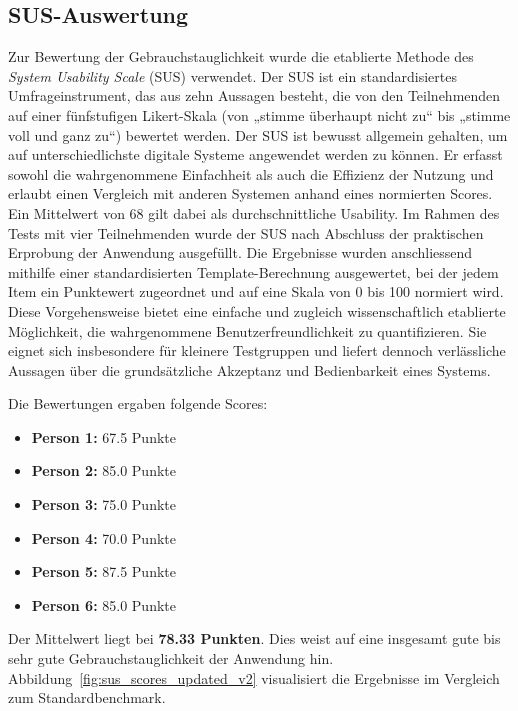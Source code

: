 \subsection{SUS-Auswertung}

Zur Bewertung der Gebrauchstauglichkeit wurde die etablierte Methode des \textit{System Usability Scale} (SUS) verwendet. Der SUS ist ein standardisiertes Umfrageinstrument, das aus zehn Aussagen besteht, die von den Teilnehmenden auf einer fünfstufigen Likert-Skala (von „stimme überhaupt nicht zu“ bis „stimme voll und ganz zu“) bewertet werden. Der SUS ist bewusst allgemein gehalten, um auf unterschiedlichste digitale Systeme angewendet werden zu können. Er erfasst sowohl die wahrgenommene Einfachheit als auch die Effizienz der Nutzung und erlaubt einen Vergleich mit anderen Systemen anhand eines normierten Scores. Ein Mittelwert von 68 gilt dabei als durchschnittliche Usability. Im Rahmen des Tests mit vier Teilnehmenden wurde der SUS nach Abschluss der praktischen Erprobung der Anwendung ausgefüllt. Die Ergebnisse wurden anschliessend mithilfe einer standardisierten Template-Berechnung ausgewertet, bei der jedem Item ein Punktewert zugeordnet und auf eine Skala von 0 bis 100 normiert wird. Diese Vorgehensweise bietet eine einfache und zugleich wissenschaftlich etablierte Möglichkeit, die wahrgenommene Benutzerfreundlichkeit zu quantifizieren. Sie eignet sich insbesondere für kleinere Testgruppen und liefert dennoch verlässliche Aussagen über die grundsätzliche Akzeptanz und Bedienbarkeit eines Systems.\\  \cite{brooke1986sus} \cite{uiuxtrendSUS}

Die Bewertungen ergaben folgende Scores:
\begin{itemize}
    \item \textbf{Person 1:} 67.5 Punkte
    \item \textbf{Person 2:} 85.0 Punkte
    \item \textbf{Person 3:} 75.0 Punkte
    \item \textbf{Person 4:} 70.0 Punkte
    \item \textbf{Person 5:} 87.5 Punkte
    \item \textbf{Person 6:} 85.0 Punkte
\end{itemize}

Der Mittelwert liegt bei \textbf{78.33 Punkten}. Dies weist auf eine insgesamt gute bis sehr gute Gebrauchstauglichkeit der Anwendung hin. Abbildung~\ref{fig:sus_scores_updated_v2} visualisiert die Ergebnisse im Vergleich zum Standardbenchmark.

